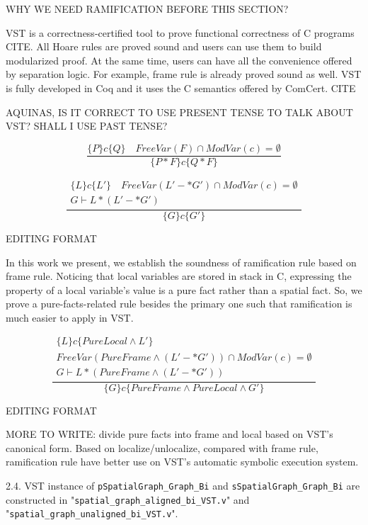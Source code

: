 WHY WE NEED RAMIFICATION BEFORE THIS SECTION?

VST is a correctness-certified tool to prove functional correctness of C programs CITE. All Hoare rules are proved sound and users can use them to build modularized proof. At the same time, users can have all the convenience offered by separation logic. For example, frame rule is already proved sound as well. VST is fully developed in Coq and it uses the C semantics offered by ComCert. CITE

AQUINAS, IS IT CORRECT TO USE PRESENT TENSE TO TALK ABOUT VST? SHALL I USE PAST TENSE?

$$ \frac{\{ P \} c \{Q \} \quad FreeVar(F) \cap ModVar(c) = \emptyset } {\{P * F \} c \{ Q * F \}} $$

\[
\frac{
\begin{array}{c}
\{ L \} c \{L' \} \quad FreeVar(L' -* G') \cap ModVar(c) = \emptyset \\
G \vdash L * (L' -* G')
\end{array}
}
{\{G \} c \{ G' \}}
\]

EDITING FORMAT

In this work we present, we establish the soundness of ramification rule based on frame rule. Noticing that local variables are stored in stack in C, expressing the property of a local variable's value is a pure fact rather than a spatial fact. So, we prove a pure-facts-related rule besides the primary one such that ramification is much easier to apply in VST.

\[
\frac
{
\begin{array}{c}
\{ L \} c \{PureLocal \wedge L' \} \\ 
FreeVar(PureFrame \wedge (L' -* G')) \cap ModVar(c) = \emptyset \\
G \vdash L * (PureFrame \wedge (L' -* G'))
\end{array}
} {\{G \} c \{ PureFrame \wedge PureLocal \wedge G' \}}
\]

EDITING FORMAT


MORE TO WRITE: divide pure facts into frame and local based on VST's canonical form. Based on localize/unlocalize, compared with frame rule, ramification rule have better use on VST's automatic symbolic execution system.





2.4. VST instance of \texttt{pSpatialGraph\_Graph\_Bi} and \texttt{sSpatialGraph\_Graph\_Bi} are constructed in "\texttt{spatial\_graph\_aligned\_bi\_VST.v}" and "\texttt{spatial\_graph\_unaligned\_bi\_VST.v}".

